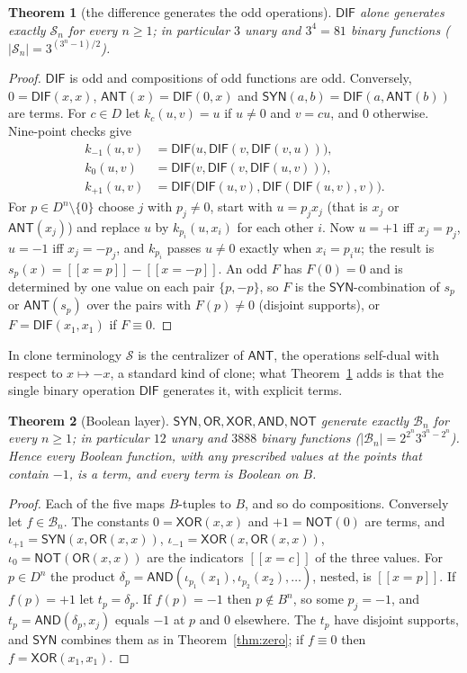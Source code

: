 \documentclass[conference]{IEEEtran}
\newcommand{\D}{D}
\newcommand{\SYN}{\mathsf{SYN}}
\newcommand{\DIF}{\mathsf{DIF}}
\newcommand{\OR}{\mathsf{OR}}
\newcommand{\XOR}{\mathsf{XOR}}
\newcommand{\AND}{\mathsf{AND}}
\newcommand{\NOT}{\mathsf{NOT}}
\newcommand{\ANT}{\mathsf{ANT}}
\newcommand{\Odd}{\mathcal S}
\newcommand{\BP}{\mathcal B}
\newcommand{\iv}[1]{[\![#1]\!]}
\newtheorem{theorem}{Theorem}
\theoremstyle{remark}
\begin{document}
	\begin{theorem}[the difference generates the odd operations]\label{thm:odd}
		$\DIF$ alone generates exactly $\Odd_n$ for every $n\ge1$; in particular $3$ unary and $3^4=81$ binary functions ($|\Odd_n|=3^{(3^n-1)/2}$).
	\end{theorem}
	\begin{proof}
		$\DIF$ is odd and compositions of odd functions are odd. Conversely, $0=\DIF(x,x)$, $\ANT(x)=\DIF(0,x)$ and $\SYN(a,b)=\DIF(a,\ANT(b))$ are terms. For $c\in\D$ let $k_c(u,v)=u$ if $u\ne0$ and $v=cu$, and $0$ otherwise. Nine-point checks give
		\begin{align*}
			k_{-1}(u,v)&=\DIF\big(u,\DIF(v,\DIF(v,u))\big),\\
			k_{0}(u,v)&=\DIF\big(v,\DIF(v,\DIF(u,v))\big),\\
			k_{+1}(u,v)&=\DIF\big(\DIF(u,v),\DIF(\DIF(u,v),v)\big).
		\end{align*}
		For $p\in\D^n\setminus\{0\}$ choose $j$ with $p_j\ne0$, start with $u=p_jx_j$ (that is $x_j$ or $\ANT(x_j)$) and replace $u$ by $k_{p_i}(u,x_i)$ for each other $i$. Now $u=+1$ iff $x_j=p_j$, $u=-1$ iff $x_j=-p_j$, and $k_{p_i}$ passes $u\neq0$ exactly when $x_i=p_iu$; the result is $s_p(x)=\iv{x=p}-\iv{x=-p}$. An odd $F$ has $F(0)=0$ and is determined by one value on each pair $\{p,-p\}$, so $F$ is the $\SYN$-combination of $s_p$ or $\ANT(s_p)$ over the pairs with $F(p)\ne0$ (disjoint supports), or $F=\DIF(x_1,x_1)$ if $F\equiv0$.
	\end{proof}
	In clone terminology $\Odd$ is the centralizer of $\ANT$, the operations self-dual with respect to $x\mapsto-x$, a standard kind of clone; what Theorem~\ref{thm:odd} adds is that the single binary operation $\DIF$ generates it, with explicit terms.
	
	\begin{theorem}[Boolean layer]\label{thm:bool}
		$\SYN,\OR,\XOR,\AND,\NOT$ generate exactly $\BP_n$ for every $n\ge1$; in particular $12$ unary and $3888$ binary functions ($|\BP_n|=2^{2^n}3^{3^n-2^n}$). Hence every Boolean function, with any prescribed values at the points that contain $-1$, is a term, and every term is Boolean on $B$.
	\end{theorem}
	\begin{proof}
		Each of the five maps $B$-tuples to $B$, and so do compositions. Conversely let $f\in\BP_n$. The constants $0=\XOR(x,x)$ and $+1=\NOT(0)$ are terms, and $\iota_{+1}=\SYN(x,\OR(x,x))$, $\iota_{-1}=\XOR(x,\OR(x,x))$, $\iota_0=\NOT(\OR(x,x))$ are the indicators $\iv{x=c}$ of the three values. For $p\in\D^n$ the product $\delta_p=\AND(\iota_{p_1}(x_1),\iota_{p_2}(x_2),\dots)$, nested, is $\iv{x=p}$. If $f(p)=+1$ let $t_p=\delta_p$. If $f(p)=-1$ then $p\notin B^n$, so some $p_j=-1$, and $t_p=\AND(\delta_p,x_j)$ equals $-1$ at $p$ and $0$ elsewhere. The $t_p$ have disjoint supports, and $\SYN$ combines them as in Theorem~\ref{thm:zero}; if $f\equiv0$ then $f=\XOR(x_1,x_1)$.
	\end{proof}
	
\end{document}
